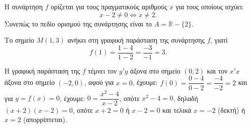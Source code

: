 
\begin{alist}
\item Η συνάρτηση $f$ ορίζεται για τους πραγματικούς αριθμούς $x$ για τους οποίους ισχύει:
\[x - 2 \ne 0 \Leftrightarrow x \ne 2.\]
Συνεπώς το πεδίο ορισμού της συνάρτησης είναι το $A = \mathbb{R} - \{2\}$.

\item Το σημείο $M(1, 3)$ ανήκει στη γραφική παράσταση της συνάρτησης $f$, γιατί
\[f(1) = \dfrac{1 - 4}{1 - 2} = \dfrac{-3}{-1} = 3.\]

\item Η γραφική παράσταση της $f$ τέμνει τον $y'y$ άξονα στο σημείο $(0, 2)$ και τον $x'x$ άξονα
στο σημείο $(-2, 0)$, αφού
για $x = 0$, έχουμε: $f(0) = \dfrac{0 - 4}{0 - 2} = \dfrac{-4}{-2} = 2$ και
για $y = f(x) = 0$, έχουμε: $0 = \dfrac{x^2 - 4}{x - 2}$, οπότε
$x^2 - 4 = 0$, δηλαδή $(x + 2)(x - 2) = 0$, οπότε $x + 2 = 0$ ή $x - 2 = 0$ και τελικά 
$x = -2$ (δεκτή) ή $x = 2$ (απορρίπτεται).
\end{alist}

